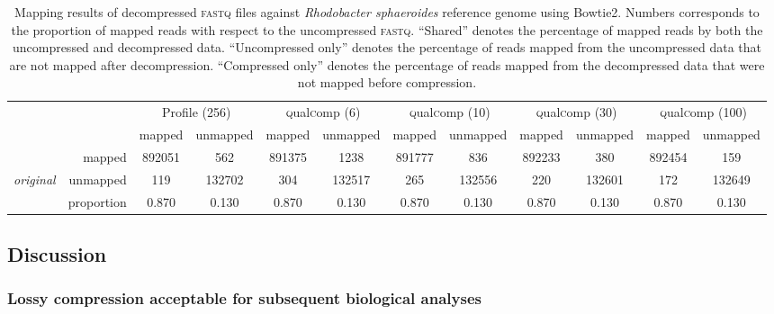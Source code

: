 \begin{landscape}
\begin{table}[!tbhp]
\begin{tabular}{lr|cc|cc|cc|cc|cc}
&  & \multicolumn{2}{c|}{Profile (256)} & \multicolumn{2}{c|}{\textsc{q}ual\textsc{c}omp (6)} & \multicolumn{2}{c|}{\textsc{q}ual\textsc{c}omp (10)} & \multicolumn{2}{c|}{\textsc{q}ual\textsc{c}omp (30)} & \multicolumn{2}{c}{\textsc{q}ual\textsc{c}omp (100)} \\
& &  mapped & unmapped & mapped & unmapped & mapped & unmapped & mapped & unmapped & mapped & unmapped \\
\cline{2-12}
& mapped & 892051 & 562 & 891375 & 1238 & 891777 & 836 & 892233 & 380 & 892454 & 159 \\
{\em original}  & unmapped & 119 & 132702 & 304 & 132517 & 265 & 132556 & 220 & 132601 & 172 & 132649 \\
\cline{2-12}
& proportion & 0.870 & 0.130 & 0.870 & 0.130 & 0.870 & 0.130 & 0.870 & 0.130 & 0.870 & 0.130 \\

\end{tabular}

\caption[Mapping results of decompressed \textsc{fastq} files
  against \textit{Rhodobacter sphaeroides} reference genome]{Mapping results of decompressed \textsc{fastq} files
  against \textit{Rhodobacter sphaeroides} reference genome using
  Bowtie2. Numbers corresponds to the proportion of mapped reads with
  respect to the uncompressed \textsc{fastq}. ``Shared'' denotes the
  percentage of mapped reads by both the uncompressed and decompressed
  data. ``Uncompressed only'' denotes the percentage of reads mapped
  from the uncompressed data that are not mapped after
  decompression. ``Compressed only'' denotes the percentage of reads
  mapped from the decompressed data that were not mapped before
  compression.}

\label{tab:aligner}
\end{table}

\renewcommand{\baselinestretch}{2}
\small\normalsize
\end{landscape}


\subsection{Discussion}

\subsubsection{Lossy compression acceptable for subsequent biological analyses}

